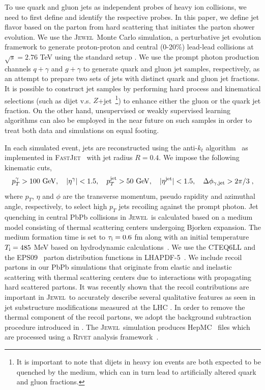 \documentclass[notoc,preprintnumbers]{JHEP3}
\newcommand{\text}[1]{{\rm #1}}
\newcommand{\jw}{\textsc{Jewel}~}
\begin{document}
To use quark and gluon jets as independent probes of heavy ion collisions, we need to first define and identify the respective probes. In this paper, we define jet flavor based on the parton from hard scattering that initiates the parton shower evolution. We use the \jw Monte Carlo simulation, a perturbative jet evolution framework to generate proton-proton and central (0-20\%) lead-lead collisions at $\sqrt{s}=2.76$ TeV using the standard setup \cite{Zapp:2013zya}. We use the prompt photon production channels \cite{KunnawalkamElayavalli:2016ttl} $q +\gamma$ and $g +\gamma$ to generate quark and gluon jet samples, respectively, as an attempt to prepare two sets of jets with distinct quark and gluon jet fractions. It is possible to construct jet samples by performing hard process and kinematical selections (such as dijet v.s. $Z$+jet~\footnote{It is important to note that dijets in heavy ion events are both expected to be quenched by the medium, which can in turn lead to artificially altered quark and gluon fractions.}) to enhance either the gluon or the quark jet fraction. On the other hand, unsupervised or weakly supervised learning algorithms \cite{Dery:2017fap, Cohen:2017exh, Metodiev:2017vrx,Komiske:2018oaa,Metodiev:2018ftz} can also be employed in the near future on such samples in order to treat both data and simulations on equal footing.

In each simulated event, jets are reconstructed using the anti-$k_t$ algorithm~\cite{Cacciari:2008gp} as implemented in \textsc{FastJet}~\cite{Cacciari:2011ma} with jet radius $R = 0.4$. We impose the following kinematic cuts,
\begin{equation}
    p^{\gamma}_T > 100~{\rm GeV}, ~~~ |\eta^{\rm \gamma}|<1.5, ~~~ p^{\rm jet}_T > 50~{\rm GeV}, ~~~ |\eta^{\rm jet}|<1.5, ~~~\Delta \phi_{\gamma, {\rm jet}} > 2\pi/3\;,
\end{equation}
where $p_T$, $\eta$ and $\phi$ are the transverse momentum, pseudo rapidity and azimuthal angle, respectively, to select high $p_T$ jets recoiling against the prompt photon. Jet quenching in central PbPb collisions in \jw is calculated based on a medium model consisting of thermal scattering centers undergoing Bjorken expansion. The medium formation time is set to $\tau_\text{i}=0.6 $ fm along with an initial temperature $T_\text{i}=485$ MeV based on hydrodynamic calculations~\cite{Shen:2012vn,Shen:2014vra}. We use the \textsc{CTEQ6LL} \cite{Pumplin:2002vw} and the \textsc{EPS09}~\cite{Eskola:2009uj} parton distribution functions in \textsc{LHAPDF-5}~\cite{Whalley:2005nh}. We include recoil partons in our PbPb simulations that originate from elastic and inelastic scattering with thermal scattering centers due to interactions with propagating hard scattered partons. It was recently shown that the recoil contributions are important in \jw to accurately describe several qualitative features as seen in jet substructure modifications measured at the LHC \cite{KunnawalkamElayavalli:2017hxo,Milhano:2017nzm}. In order to remove the thermal component of the recoil partons, we adopt the background subtraction procedure introduced in \cite{KunnawalkamElayavalli:2017hxo,Milhano:2017nzm}. The \jw simulation produces HepMC~\cite{Dobbs:2001ck} files which are processed using a \textsc{Rivet} analysis framework~\cite{Buckley:2010ar}.
\end{document}
